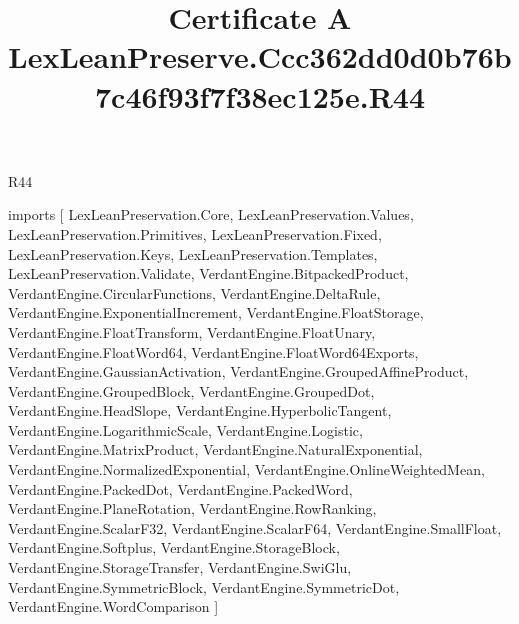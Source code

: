 \begin{lexlean}{R44}
\title{Certificate A LexLeanPreserve.Ccc362dd0d0b76b7c46f93f7f38ec125e.R44}
\begin{coremodule}
imports [
  LexLeanPreservation.Core,
  LexLeanPreservation.Values,
  LexLeanPreservation.Primitives,
  LexLeanPreservation.Fixed,
  LexLeanPreservation.Keys,
  LexLeanPreservation.Templates,
  LexLeanPreservation.Validate,
  VerdantEngine.BitpackedProduct,
  VerdantEngine.CircularFunctions,
  VerdantEngine.DeltaRule,
  VerdantEngine.ExponentialIncrement,
  VerdantEngine.FloatStorage,
  VerdantEngine.FloatTransform,
  VerdantEngine.FloatUnary,
  VerdantEngine.FloatWord64,
  VerdantEngine.FloatWord64Exports,
  VerdantEngine.GaussianActivation,
  VerdantEngine.GroupedAffineProduct,
  VerdantEngine.GroupedBlock,
  VerdantEngine.GroupedDot,
  VerdantEngine.HeadSlope,
  VerdantEngine.HyperbolicTangent,
  VerdantEngine.LogarithmicScale,
  VerdantEngine.Logistic,
  VerdantEngine.MatrixProduct,
  VerdantEngine.NaturalExponential,
  VerdantEngine.NormalizedExponential,
  VerdantEngine.OnlineWeightedMean,
  VerdantEngine.PackedDot,
  VerdantEngine.PackedWord,
  VerdantEngine.PlaneRotation,
  VerdantEngine.RowRanking,
  VerdantEngine.ScalarF32,
  VerdantEngine.ScalarF64,
  VerdantEngine.SmallFloat,
  VerdantEngine.Softplus,
  VerdantEngine.StorageBlock,
  VerdantEngine.StorageTransfer,
  VerdantEngine.SwiGlu,
  VerdantEngine.SymmetricBlock,
  VerdantEngine.SymmetricDot,
  VerdantEngine.WordComparison
]


\end{coremodule}
\end{lexlean}
